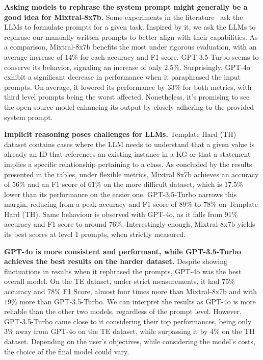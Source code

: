 \documentclass[runningheads]{llncs}
\begin{document}
\textbf{Asking models to rephrase the system prompt might generally be a good idea for Mixtral-8x7b.} Some experiments in the literature~\cite{pan2023} ask the LLMs to formulate prompts for a given task. Inspired by it, we ask the LLMs to rephrase our manually written prompts to better align with their capabilities. As a comparison, Mixtral-8x7b benefits the most under rigorous evaluation, with an average increase of $14\%$ for each accuracy and F1 score. GPT-3.5-Turbo seems to conserve its behavior, signaling an increase of only $2.5\%$.
Surprisingly, GPT-4o exhibit a significant decrease in performance when it paraphrased the input prompts. On average, it lowered its performance by $33\%$ for both metrics, with third level prompts being the worst affected.
 Nonetheless, it's promising to see the open-source model enhancing its output by closely adhering to the provided system prompt.

\textbf{Implicit reasoning poses challenges for LLMs.} Template Hard (TH) dataset contains cases where the LLM needs to understand that a given value is already an ID that references an existing instance in a KG or that a statement implies a specific relationship pertaining to a class. As concluded by the results presented in the tables, under flexible metrics, Mixtral 8x7b achieves an accuracy of $56\%$ and an F1 score of $61\%$ on the more difficult dataset, which is $17.5\%$ lower than its performance on the easier one. GPT-3.5-Turbo narrows this margin, reducing from a peak accuracy and F1 score of $89\%$ to $78\%$ on Template Hard (TH). Same behaviour is observed with GPT-4o, as it falls from $91\%$ accuracy and F1 score to around $76\%$.
Interestingly enough, Mixtral-8x7b yields its best scores at level 1 prompts, when strictly measured. 

\textbf{GPT-4o is more consistent and performant, while GPT-3.5-Turbo achieves the best results on the harder dataset.}
Despite showing fluctuations in results when it rephrased the prompts, GPT-4o was the best overall model. On the TE dataset, under strict measurements, it had $75\%$ accuracy and $78\%$ F1 Score, almost four times more than Mixtral-8x7b and with $19\%$ more than GPT-3.5-Turbo. We can interpret the results as GPT-4o is more reliable than the other two models, regardless of the prompt level. However, GPT-3.5-Turbo came close to it considering their top performances, being only $3\%$ away from GPT-4o on the TE dataset, while surpassing it by $4\%$ on the TH dataset. Depending on the user's objectives, while considering the model's costs, the choice of the final model could vary.
\end{document}
